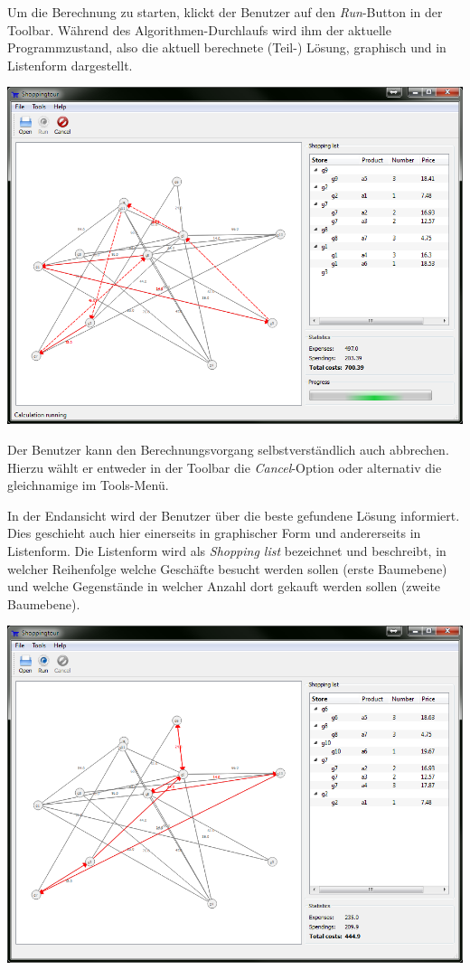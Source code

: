 \newpage

Um die Berechnung zu starten, klickt der Benutzer auf den \emph{Run}-Button in der Toolbar. Während des Algorithmen-Durchlaufs wird ihm der aktuelle Programmzustand, also die aktuell berechnete (Teil-) Lösung, graphisch und in Listenform dargestellt.

\includegraphics[width=1\textwidth]{resourcen/walkthrough/3-running-clingo.png}

\newpage

Der Benutzer kann den Berechnungsvorgang selbstverständlich auch abbrechen. Hierzu wählt er entweder in der Toolbar die \emph{Cancel}-Option oder alternativ die gleichnamige im Tools-Menü.

In der Endansicht wird der Benutzer über die beste gefundene Lösung informiert. Dies geschieht auch hier einerseits in graphischer Form und andererseits in Listenform. Die Listenform wird als \emph{Shopping list} bezeichnet und beschreibt, in welcher Reihenfolge welche Geschäfte besucht werden sollen (erste Baumebene) und welche Gegenstände in welcher Anzahl dort gekauft werden sollen (zweite Baumebene).

\includegraphics[width=1\textwidth]{resourcen/walkthrough/4-finished-clingo.png}

\newpage